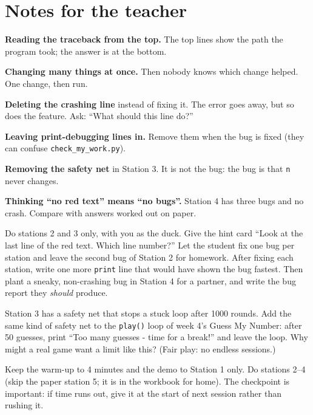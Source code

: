 \section{Notes for the teacher}
\begin{commonmistakes}
  \item \textbf{Reading the traceback from the top.} The top lines show the path the program took; the answer is at the bottom.
  \item \textbf{Changing many things at once.} Then nobody knows which change helped. One change, then run.
  \item \textbf{Deleting the crashing line} instead of fixing it. The error goes away, but so does the feature. Ask: \enquote{What should this line do?}
  \item \textbf{Leaving print-debugging lines in.} Remove them when the bug is fixed (they can confuse \texttt{check\_my\_work.py}).
  \item \textbf{Removing the safety net} in Station 3. It is not the bug: the bug is that \texttt{n} never changes.
  \item \textbf{Thinking \enquote{no red text} means \enquote{no bugs}.} Station 4 has three bugs and no crash. Compare with answers worked out on paper.
\end{commonmistakes}

\begin{differentiation}
\supportpath Do stations 2 and 3 only, with you as the duck. Give the hint card \enquote{Look at the last line of the red text. Which line number?}
Let the student fix one bug per station and leave the second bug of Station 2 for homework.
\extensionpath After fixing each station, write one more \texttt{print} line that would have shown the bug fastest. Then plant a sneaky,
non-crashing bug in Station 4 for a partner, and write the bug report they \emph{should} produce.
\end{differentiation}

\begin{stretchchallenge}
Station 3 has a safety net that stops a stuck loop after 1000 rounds. Add the same kind of safety net to the \texttt{play()} loop of
week 4's Guess My Number: after 50 guesses, print \enquote{Too many guesses - time for a break!} and leave the loop. Why might a real game
want a limit like this? (Fair play: no endless sessions.)
\end{stretchchallenge}

\begin{teachernote}
Keep the warm-up to 4 minutes and the demo to Station 1 only. Do stations 2--4 (skip the paper station 5; it is in the workbook
for home). The checkpoint is important: if time runs out, give it at the start of next session rather than rushing it.
\end{teachernote}
